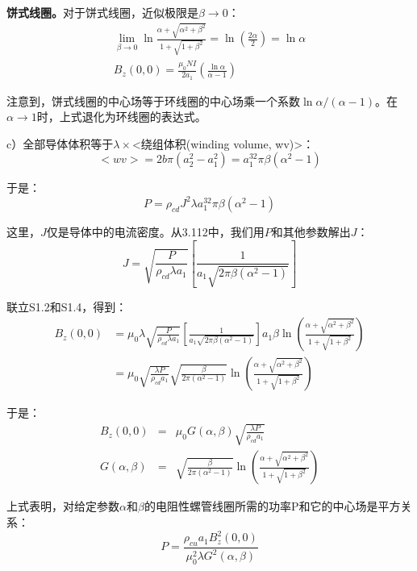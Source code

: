 \textbf{饼式线圈。}对于饼式线圈，近似极限是$\beta\rightarrow 0$：
\begin{eqnarray}
\lim_{\beta\rightarrow 0}\ln\frac{\alpha+\sqrt{\alpha^2+\beta^2}}{1+\sqrt{1+\beta^2}}=\ln(\frac{2\alpha}{2})=\ln\alpha\\%
B_z(0,0)=\frac{\mu_0NI}{2a_1}(\frac{\ln\alpha}{\alpha-1})%
\end{eqnarray}

注意到，饼式线圈的中心场等于环线圈的中心场乘一个系数$\ln \alpha/(\alpha-1)$。在$\alpha\rightarrow 1$时，上式退化为环线圈的表达式。

c）全部导体体积等于$\lambda\times$<绕组体积(winding volume, wv)>：
\begin{equation}
<wv>=2b\pi(a_2^2-a_1^2)=a_1^32\pi\beta(\alpha^2-1)%
\end{equation}

于是：
\begin{equation}
P=\rho_{cd}J^2\lambda a_1^32\pi\beta(\alpha^2-1)%
\end{equation}

这里，$J$仅是导体中的电流密度。从3.112中，我们用$P$和其他参数解出$J$：
\begin{equation}
J=\sqrt{\frac{P}{\rho_{cd}\lambda a_1}}\left[\frac{1}{a_1\sqrt{2\pi\beta(\alpha^2-1)}}\right]%
\end{equation}

联立S1.2和S1.4，得到：
\begin{equation}
\begin{split}
B_z(0,0)&=\mu_0\lambda\sqrt{\frac{P}{\rho_{cd}\lambda a_1}}\left[\frac{1}{a_1\sqrt{2\pi\beta(\alpha^2-1)}}\right]a_1\beta\ln(\frac{\alpha+\sqrt{\alpha^2+\beta^2}}{1+\sqrt{1+\beta^2}})\\
&=\mu_0\sqrt{\frac{\lambda P}{\rho_{cd}a_1}}\sqrt{\frac{\beta}{2\pi(\alpha^2-1)}}\ln\left(\frac{\alpha+\sqrt{\alpha^2+\beta^2}}{1+\sqrt{1+\beta^2}}\right)%
\end{split}
\end{equation}

于是：
\begin{eqnarray}
B_z(0,0)&=&\mu_0G(\alpha,\beta)\sqrt{\frac{\lambda P}{\rho_{cd}a_1}}\\ %
G(\alpha,\beta)&=&\sqrt{\frac{\beta}{2\pi(\alpha^2-1)}}\ln\left(\frac{\alpha+\sqrt{\alpha^2+\beta^2}}{1+\sqrt{1+\beta^2}}\right)%
\end{eqnarray}

上式表明，对给定参数$\alpha$和$\beta$的电阻性螺管线圈所需的功率P和它的中心场是平方关系：
\begin{equation}
P=\frac{\rho_{cu}a_1B_z^2(0,0)}{\mu_0^2\lambda G^2(\alpha,\beta)}%
\end{equation}

